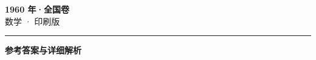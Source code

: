 \documentclass[zihao=5, a4paper]{ctexart}
\begin{document}
\begin{center}
  {\Large\bfseries 1960 年·全国卷}\\[4pt]
  {\large 数学 · 印刷版}
\end{center}
\medskip
{}

\par\bigskip\hrule\bigskip
{}
\begin{center}{\large\bfseries 参考答案与详细解析}\end{center}
\smallskip

\end{document}
